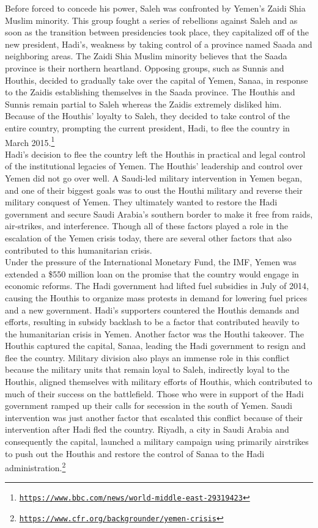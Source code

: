 \documentclass[10pt, letterpaper]{article}
\begin{document}
Before forced to concede his power, Saleh was confronted by Yemen's
Zaidi Shia Muslim minority. This group fought a series of rebellions
against Saleh and as soon as the transition between presidencies took
place, they capitalized off of the new president, Hadi's, weakness by
taking control of a province named Saada and neighboring areas. The
Zaidi Shia Muslim minority believes that the Saada province is their
northern heartland. Opposing groups, such as Sunnis and Houthis, decided
to gradually take over the capital of Yemen, Sanaa, in response to the
Zaidis establishing themselves in the Saada province. The Houthis and
Sunnis remain partial to Saleh whereas the Zaidis extremely disliked
him. Because of the Houthis' loyalty to Saleh, they decided to take
control of the entire country, prompting the current president, Hadi, to
flee the country in March 2015.\footnote{\texttt{\href{https://www.bbc.com/news/world-middle-east-29319423}{{https://www.bbc.com/news/world-middle-east-29319423}}}} \\

Hadi's decision to flee the country left the Houthis in practical and
legal control of the institutional legacies of Yemen. The Houthis'
leadership and control over Yemen did not go over well. A Saudi-led
military intervention in Yemen began, and one of their biggest goals was
to oust the Houthi military and reverse their military conquest of
Yemen. They ultimately wanted to restore the Hadi government and secure
Saudi Arabia's southern border to make it free from raids, air-strikes,
and interference. Though all of these factors played a role in the
escalation of the Yemen crisis today, there are several other factors
that also contributed to this humanitarian crisis. \\

Under the pressure of the International Monetary Fund, the IMF, Yemen
was extended a \$550 million loan on the promise that the country would
engage in economic reforms. The Hadi government had lifted fuel
subsidies in July of 2014, causing the Houthis to organize mass protests
in demand for lowering fuel prices and a new government. Hadi's
supporters countered the Houthis demands and efforts, resulting in
subsidy backlash to be a factor that contributed heavily to the
humanitarian crisis in Yemen. Another factor was the Houthi takeover.
The Houthis captured the capital, Sanaa, leading the Hadi government to
resign and flee the country. Military division also plays an immense
role in this conflict because the military units that remain loyal to
Saleh, indirectly loyal to the Houthis, aligned themselves with military
efforts of Houthis, which contributed to much of their success on the
battlefield. Those who were in support of the Hadi government ramped up
their calls for secession in the south of Yemen. Saudi intervention was
just another factor that escalated this conflict because of their
intervention after Hadi fled the country. Riyadh, a city in Saudi Arabia
and consequently the capital, launched a military campaign using
primarily airstrikes to push out the Houthis and restore the control of
Sanaa to the Hadi administration.\footnote{\texttt{\href{https://www.cfr.org/backgrounder/yemen-crisis}{{https://www.cfr.org/backgrounder/yemen-crisis}}}}
\end{document}

